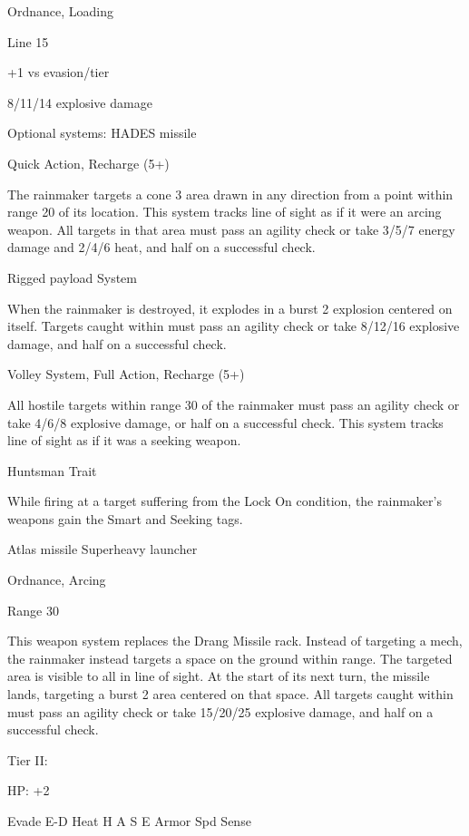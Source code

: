 Ordnance, Loading
 
Line 15
 
+1 vs evasion/tier
 
8/11/14 explosive damage
 

Optional systems:  
HADES missile
 
Quick Action, Recharge (5+)
 
The rainmaker targets a cone 3 area drawn in any direction from a point within range 20 of its  
location. This system tracks line of sight as if it were an arcing weapon. All targets in that area  
must pass an agility check or take 3/5/7 energy damage and 2/4/6 heat, and half on a successful  
check.
 

                                                                                                          


Rigged payload  
System
 
When the rainmaker is destroyed, it explodes in a burst 2 explosion centered on itself. Targets  
caught within must pass an agility check or take 8/12/16 explosive damage, and half on a  
successful check.
 

Volley  
System, Full Action, Recharge (5+)
 
All hostile targets within range 30 of the rainmaker must pass an agility check or take 4/6/8  
explosive damage, or half on a successful check. This system tracks line of sight as if it was a  
seeking weapon.
 

Huntsman  
Trait
 
While firing at a target suffering from the Lock On condition, the rainmaker’s weapons gain the  
Smart and Seeking tags.
 

Atlas missile  
Superheavy launcher
 
Ordnance, Arcing
 
Range 30
 
This weapon system replaces the Drang Missile rack. Instead of targeting a mech, the rainmaker  
instead targets a space on the ground within range. The targeted area is visible to all in line of  
sight. At the start of its next turn, the missile lands, targeting a burst 2 area centered on that  
space. All targets caught within must pass an agility check or take 15/20/25 explosive damage,  
and half on a successful check.
 

Tier II:
 
HP: +2
 

          Evade     E-D    Heat    H    A     S     E       Armor        Spd      Sense 

